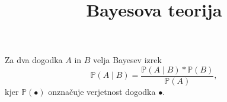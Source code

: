 \documentclass[a4paper,12pt]{article}
\begin{document}
\title{Bayesova teorija}
\maketitle  

Za dva dogodka $A$ in $B$ velja Bayesev izrek
\[\mathbb{P}(A \mid B) = \frac{\mathbb{P}(A \mid B) * \mathbb{P}(B)}{\mathbb{P}(A)},\]
kjer $\mathbb{P}(\bullet)$ onznačuje verjetnost dogodka $\bullet$. 
\end{document}
